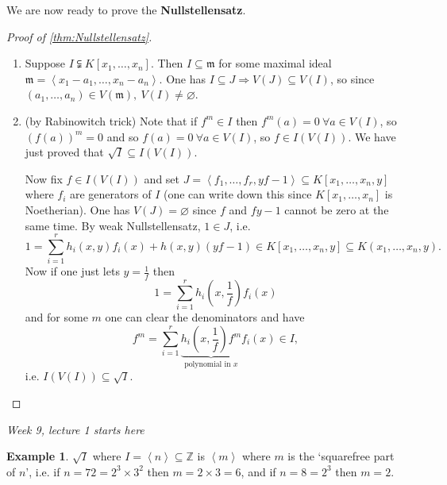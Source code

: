 \documentclass[a4paper]{article}
\newcommand{\la}{\left\langle}
\newcommand{\ra}{\right\rangle}
\newcommand{\Z}{\mathbb Z}
\newcommand{\m}{\mathfrak m}
\theoremstyle{definition}
\newtheorem{example}[defn]{Example}
\begin{document}
We are now ready to prove the \textbf{Nullstellensatz}.
\begin{proof}[Proof of \ref{thm:Nullstellensatz}]
\begin{enumerate}
\item Suppose $I\subsetneqq K[x_1,\ldots,x_n]$. Then $I\subseteq \m$ for some maximal ideal $\m=\la x_1-a_1,\ldots,x_n-a_n\ra$. One has $I\subseteq J\Rightarrow V(J)\subseteq V(I)$, so since $(a_1,\ldots,a_n)\in V(\m),\ V(I)\neq\varnothing$.
\item (by Rabinowitch trick) Note that if $f^m\in I$ then $f^m(a)=0 \ \forall a\in V(I)$, so $(f(a))^m=0$ and so $f(a)=0 \ \forall a\in V(I)$, so $f\in I(V(I))$. We have just proved that $\sqrt I\subseteq I(V(I))$.

Now fix $f\in I(V(I))$ and set $J=\la f_1,\ldots,f_r, yf-1\ra\subseteq K[x_1,\ldots,x_n,y]$ where $f_i$ are generators of $I$ (one can write down this since $K[x_1,\ldots,x_n]$ is Noetherian). One has $V(J)=\varnothing$ since $f$ and $fy-1$ cannot be zero at the same time. By weak Nullstellensatz, $1\in J$, i.e.
\[
1=\sum_{i=1}^r h_i(x,y)f_i(x) + h(x,y)(yf-1)\in K[x_1,\ldots,x_n,y]\subseteq K(x_1,\ldots,x_n,y).
\]
Now if one just lets $y=\frac{1}{f}$ then
\[
1=\sum_{i=1}^r h_i\left(x,\frac1f\right) f_i(x)
\]
and for some $m$ one can clear the denominators and have
\[
f^m=\sum_{i=1}^r \underbrace{h_i\left(x,\frac1f\right)f^m}_{\text{polynomial in }x} f_i(x) \in I,
\]
i.e. $I(V(I))\subseteq \sqrt I$.
\end{enumerate}
\end{proof}

\begin{flushright}
\textit{Week 9, lecture 1 starts here}
\end{flushright}

\begin{example}
$\sqrt I$ where $I=\la n\ra\subseteq\Z$ is $\la m\ra$ where $m$ is the `squarefree part of $n$', i.e. if $n=72=2^3\times 3^2$ then $m=2\times 3=6$, and if $n=8=2^3$ then $m=2$.
\end{example}
\end{document}
